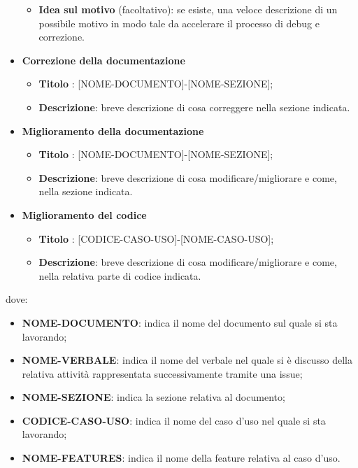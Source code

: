 \begin{itemize}
\begin{itemize}
                \item \textbf{Idea sul motivo} (facoltativo): se esiste, una veloce descrizione di un possibile motivo in modo tale da accelerare il processo di debug e correzione.
            \end{itemize}
            \item  \textbf{Correzione della documentazione}
            \begin{itemize}
                \item \textbf{Titolo} : [NOME-DOCUMENTO]-[NOME-SEZIONE];
                \item \textbf{Descrizione}: breve descrizione di cosa correggere nella sezione indicata.
            \end{itemize}
            \item  \textbf{Miglioramento della documentazione}
            \begin{itemize}
                \item \textbf{Titolo} : [NOME-DOCUMENTO]-[NOME-SEZIONE];
                \item \textbf{Descrizione}: breve descrizione di cosa modificare/migliorare e come, nella sezione indicata.
            \end{itemize}
            \item  \textbf{Miglioramento del codice}
            \begin{itemize}
                 \item \textbf{Titolo} : [CODICE-CASO-USO]-[NOME-CASO-USO];
                 \item \textbf{Descrizione}: breve descrizione di cosa modificare/migliorare e come, nella relativa parte di codice indicata.
            \end{itemize}
        \end{itemize}
        dove:

        \begin{itemize}
            \item \textbf{NOME-DOCUMENTO}: indica il nome del documento sul quale si sta lavorando;
            \item \textbf{NOME-VERBALE}: indica il nome del verbale nel quale si è discusso della relativa attività rappresentata successivamente tramite una issue;
            \item \textbf{NOME-SEZIONE}: indica la sezione relativa al documento;
            \item \textbf{CODICE-CASO-USO}: indica il nome del caso d'uso nel quale si sta lavorando;
            \item \textbf{NOME-FEATURES}: indica il nome della feature relativa al caso d'uso.
        \end{itemize}


